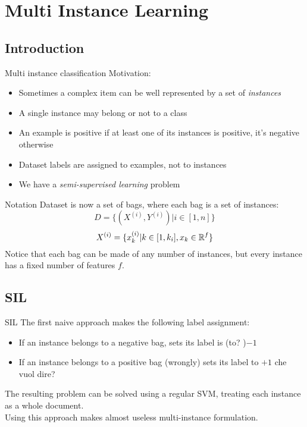 \section{Multi Instance Learning}
 
\subsection{Introduction}
\begin{frame}{Multi instance classification}
	Motivation:
	\begin{itemize}\setlength\itemsep{1em}
		\item Sometimes a complex item can be well represented by a set of \textit{instances}
		\item A single instance may belong or not to a class
		\item An example is positive if at least one of its instances is positive, it's negative otherwise
		\item Dataset labels are assigned to examples, not to instances
		\item We have a \textit{semi-supervised learning} problem
	\end{itemize}
\end{frame}

\begin{frame}{Notation}
	Dataset is now a set of bags, where each bag is a set of instances:
	$$D = \{(X^{(i)}, Y^{(i)}) | i \in [1, n]\}$$
	$$X^{(i)} = \{x_k^{(i)} | k \in [1, k_i], x_k \in \mathbb{R}^f\}$$
	Notice that each bag can be made of any number of instances, but every instance has a fixed number of features $f$.
\end{frame}

\subsection{SIL}
\begin{frame}{SIL}
	The first naive approach makes the following label assignment:
	\begin{itemize}\setlength\itemsep{1em}
		\item If an instance belongs to a negative bag, sets its label is (\color{red}to? \color{black})$-1$
		\item If an instance belongs to a positive bag (wrongly) sets its label to $+1$ \color{red} che vuol dire?
	\end{itemize}
	The resulting problem can be solved using a regular SVM, treating each instance as a whole document.\\
	\vspace{12px}
	Using this approach makes almost useless multi-instance formulation.
\end{frame}


